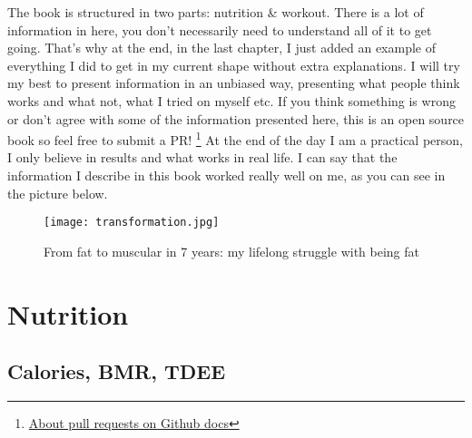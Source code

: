 \documentclass[openany, 12pt]{book}
\begin{document}
	The book is structured in two parts: nutrition \& workout. There is a lot of information in here, you don't necessarily need to understand all of it
	to get going. That's why at the end, in the last chapter, I just added an example of everything I did to get in my current shape without extra explanations. I will try 
	my best to present information in an unbiased way, presenting what people think works and what not, what I tried on myself etc. If you think 
	something is wrong or don't agree with some of the information presented here, this is an open source book so feel free to submit a PR!
        \footnote{\href{https://docs.github.com/en/free-pro-team@latest/github/collaborating-with-issues-and-pull-requests/about-pull-requests}
	{About pull requests on Github docs}} At the end of the day I am a practical person, I only believe in results and what works in real life. 
	I can say that the information I describe in this book worked really well on me, as you can see in the picture below.
	
	\begin{figure}[h]
		\centering
		\texttt{[image: transformation.jpg]}
		\caption{From fat to muscular in 7 years: my lifelong struggle with being fat}
		\label{fig1}
	\end{figure}
	
	
  \chapter{Nutrition}
  
  	\section{Calories, BMR, TDEE}
  	
\end{document}
